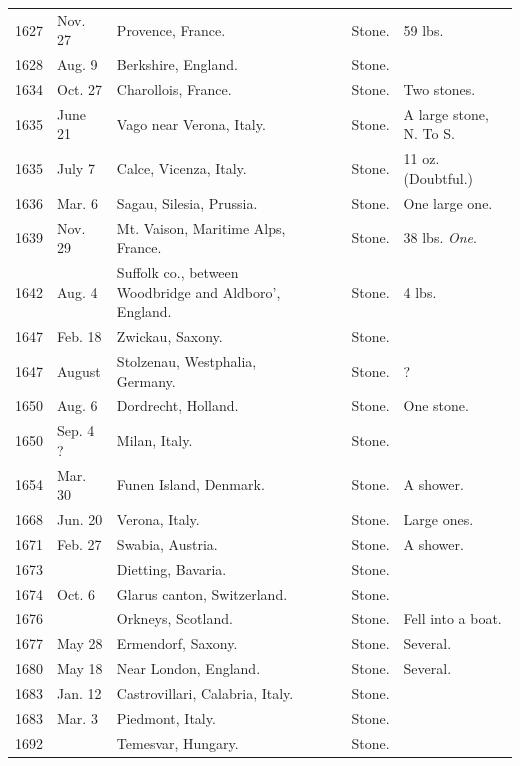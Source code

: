 \documentclass[a4paper, 12pt, oneside]{article}
\begin{document}
\begin{center}
\begin{longtable}{|p{10mm}|p{15mm}|p{32mm}|p{13mm}|p{13mm}|p{26mm}|}
        1627 & Nov. 27 & Provence, France. & ~ & Stone. & 59 lbs. \\
        1628 & Aug. 9 & Berkshire, England. & ~ & Stone. & ~ \\
        1634 & Oct. 27 & Charollois, France. & ~ & Stone. & Two stones. \\
        1635 & June 21 & Vago near Verona, Italy. & ~ & Stone. & A large stone, N. To S. \\
        1635 & July 7 & Calce, Vicenza, Italy. & ~ & Stone. & 11 oz. (Doubtful.) \\
        1636 & Mar. 6 & Sagau, Silesia, Prussia. & ~ & Stone. & One large one. \\
        1639 & Nov. 29 & Mt. Vaison, Maritime Alps, France. & ~ & Stone. & 38 lbs. \emph{One}. \\
        1642 & Aug. 4 & Suffolk co., between Woodbridge and Aldboro’, England. & ~ & Stone. & 4 lbs. \\
        1647 & Feb. 18 & Zwickau, Saxony. & ~ & Stone. & ~ \\
        1647 & August & Stolzenau, Westphalia, Germany. & ~ & Stone. & ? \\
        1650 & Aug. 6 & Dordrecht, Holland. & ~ & Stone. & One stone. \\
        1650 & Sep. 4 ? & Milan, Italy. & ~ & Stone. & ~ \\
        1654 & Mar. 30 & Funen Island, Denmark. & ~ & Stone. & A shower. \\
        1668 & Jun. 20 & Verona, Italy. & ~ & Stone. & Large ones. \\
        1671 & Feb. 27 & Swabia, Austria. & ~ & Stone. & A shower. \\
        1673 & ~ & Dietting, Bavaria. & ~ & Stone. & ~ \\
        1674 & Oct. 6 & Glarus canton, Switzerland. & ~ & Stone. & ~ \\
        1676 & ~ & Orkneys, Scotland. & ~ & Stone. & Fell into a boat. \\
        1677 & May 28 & Ermendorf, Saxony. & ~ & Stone. & Several. \\
        1680 & May 18 & Near London, England. & ~ & Stone. & Several. \\
        1683 & Jan. 12 & Castrovillari, Calabria, Italy. & ~ & Stone. & ~ \\
        1683 & Mar. 3 & Piedmont, Italy. & ~ & Stone. & ~ \\
        1692 & ~ & Temesvar, Hungary. & ~ & Stone. & ~ \\

\end{longtable}
\end{center}
\end{document}
